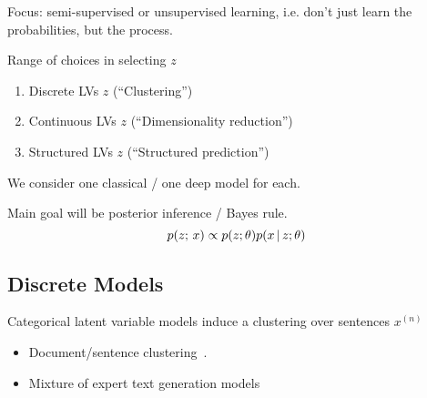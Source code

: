 \begin{frame}
    Focus: semi-supervised or unsupervised learning, i.e. don't just learn the probabilities, but the process.
    \vspace{0.5cm}
    
    Range of choices in selecting $z$ 
    \begin{enumerate}
        \item Discrete LVs $z$ (``Clustering'')
        \item Continuous LVs $z$ (``Dimensionality reduction'')
        \item Structured LVs $z$ (``Structured prediction'')
    \end{enumerate}
    We consider one classical / one deep model for each.
    
    
    \vspace{0.5cm}
    Main goal will be posterior inference / Bayes rule.
    \[ p(z ; \, x ) \propto p(z; \theta) p(x \,|\, z ;\theta) \]
\end{frame}

\subsection{Discrete Models}
\begin{frame}

\begin{center}
\end{center}



Categorical latent variable models induce a clustering over sentences $x^{(n)}$

 \begin{itemize}
     \item Document/sentence clustering~\citep{willett1988recent,aggarwal2012survey}.
     \item Mixture of expert text generation models~\citep{jacobs1991adaptive,garmash2016ensemble,lee2016stochastic}
 \end{itemize}

\end{frame}

